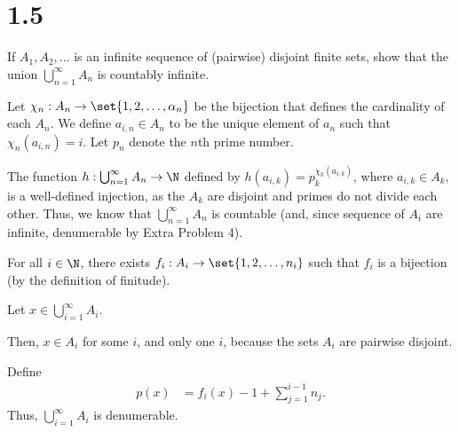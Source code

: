 \documentclass[10pt]{mypackage}
\begin{document}
\section{1.5}%
\begin{problem}
  If $A_1,A_2,\dots$ is an infinite sequence of (pairwise) disjoint finite sets, show that the union $\bigcup_{n=1}^{\infty}A_n$ is countably infinite.
\end{problem}
\begin{solution}
  Let $\chi_n: A_n \rightarrow \set{1,2,\dots,\alpha_n}$ be the bijection that defines the cardinality of each $A_n$. We define $a_{i,n}\in A_n$ to be the unique element of $a_n$ such that $\chi_{n}\left(a_{i,n}\right) = i$. Let $p_n$ denote the $n$th prime number.\newline

  The function $h: \bigcup_{n=1}^{\infty}A_n \rightarrow \N$ defined by $h\left(a_{i,k}\right) = p_k^{\chi_{k}\left(a_{i,k}\right)}$, where $a_{i,k}\in A_k$, is a well-defined injection, as the $A_k$ are disjoint and primes do not divide each other. Thus, we know that $\bigcup_{n=1}^{\infty}A_n$ is countable (and, since sequence of $A_i$ are infinite, denumerable by Extra Problem 4).
\end{solution}
{\color{blue}
\begin{solution}[Proposed]
  For all $i\in \N$, there exists $f_i: A_i \rightarrow \set{1,2,\dots,n_i}$ such that $f_i$ is a bijection (by the definition of finitude).\newline

  Let $x\in \bigcup_{i=1}^{\infty}A_i$.\newline

  Then, $x\in A_i$ for some $i$, and only one $i$, because the sets $A_i$ are pairwise disjoint.\newline

  Define
  \begin{align*}
    p(x) &= f_i(x) - 1 + \sum_{j=1}^{i-1}n_j.
  \end{align*}
  Thus, $\bigcup_{i=1}^{\infty}A_i$ is denumerable.
\end{solution}
}
\end{document}
